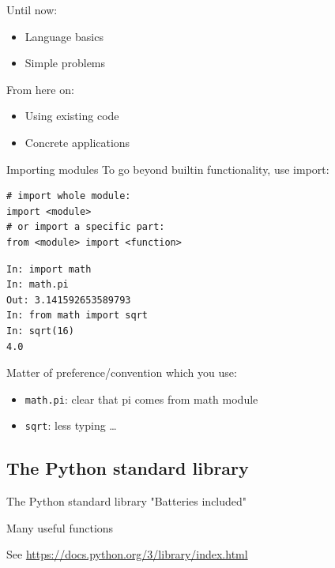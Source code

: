 \documentclass[aspectratio=169,usenames,dvipsnames]{beamer}
\begin{document}
\begin{frame}
    Until now:
        \begin{itemize}
            \item Language basics
            \item Simple problems
        \end{itemize}
    \pause
    From here on:
        \begin{itemize}
            \item Using existing code
            \item Concrete applications
        \end{itemize}
\end{frame}

\begin{frame}[fragile]{Importing modules}
To go beyond builtin functionality, use import:
\begin{lstlisting}
# import whole module:
import <module>
# or import a specific part:
from <module> import <function>
\end{lstlisting}

\pause
\begin{lstlisting}
In: import math
In: math.pi
Out: 3.141592653589793
In: from math import sqrt
In: sqrt(16)
4.0
\end{lstlisting}

Matter of preference/convention which you use:
\begin{itemize}
    \item \lstinline{math.pi}: clear that pi comes from math module
    \item \lstinline{sqrt}: less typing \dots
\end{itemize}
\end{frame}

\subsection{The Python standard library}
\begin{frame}[fragile]{The Python standard library}
	"Batteries included"

	\vspace{1em}
	Many useful functions

	\vspace{1em}
    See \url{https://docs.python.org/3/library/index.html}
\end{frame}
\end{document}

